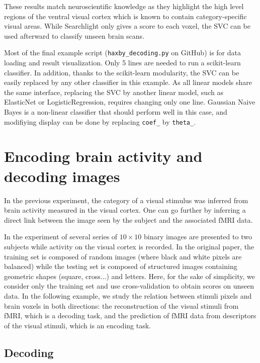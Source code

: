 \documentclass{frontiersSCNS} %
\begin{document}
These results match neuroscientific knowledge as they highlight the
high level regions of the ventral visual cortex which is known to
contain category-specific visual areas. While Searchlight only gives a
score to each voxel, the SVC can be used afterward to classify unseen
brain scans.

Most of the final example script (\texttt{haxby\_decoding.py} on GitHub) is
for data
loading and result visualization. Only 5 lines are needed to run a scikit-learn
classifier. In addition, thanks to the scikit-learn modularity, the SVC can be easily
replaced by any other classifier in this example. As all linear models share the
same interface, replacing the SVC by another linear model, such as ElasticNet
or LogisticRegression, requires changing only one line. Gaussian Naive Bayes is a non-linear
classifier that should perform well in this case, and modifiying display can be
done by replacing \texttt{coef\_} by \texttt{theta\_}.


\section{Encoding brain activity and decoding images}
\label{kamitani}

In the previous experiment, the category of a visual stimulus was inferred from
brain activity measured in the visual cortex.
One can go further by inferring a direct link between the image
seen by the subject and the associated fMRI data.

In the experiment of \cite{miyawaki2008} several series of $10{\times}10$
binary images are presented to two subjects while activity on the visual cortex
is recorded.
In the original paper, the training set is composed of random images (where black and white pixels
are balanced) while the testing set is composed of structured images containing
geometric shapes (square, cross...) and letters. Here, for the sake of simplicity, we consider only the training set and use cross-validation to
obtain scores on unseen data.
%
In the following example, we study the relation between stimuli pixels and
brain voxels in both directions: the reconstruction of the visual stimuli
from fMRI, which is a decoding task, and the prediction of fMRI data
from descriptors of the visual stimuli, which is an encoding task.

\subsection{Decoding}
\end{document}
